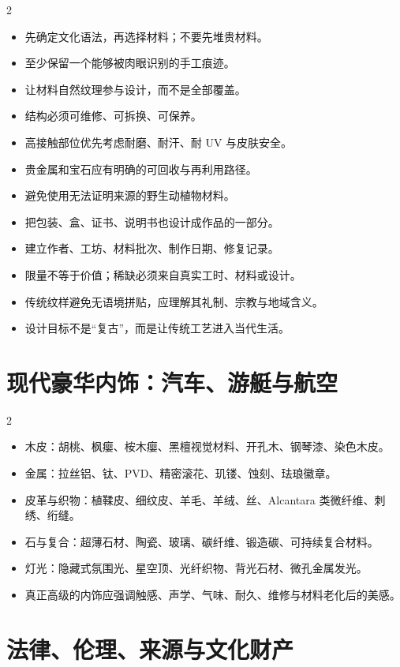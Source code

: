 \documentclass[lang=en,a4paper,11pt]{elegantpaper}
\begin{document}
\begin{multicols}{2}
\begin{itemize}
\item 先确定文化语法，再选择材料；不要先堆贵材料。
\item 至少保留一个能够被肉眼识别的手工痕迹。
\item 让材料自然纹理参与设计，而不是全部覆盖。
\item 结构必须可维修、可拆换、可保养。
\item 高接触部位优先考虑耐磨、耐汗、耐 UV 与皮肤安全。
\item 贵金属和宝石应有明确的可回收与再利用路径。
\item 避免使用无法证明来源的野生动植物材料。
\item 把包装、盒、证书、说明书也设计成作品的一部分。
\item 建立作者、工坊、材料批次、制作日期、修复记录。
\item 限量不等于价值；稀缺必须来自真实工时、材料或设计。
\item 传统纹样避免无语境拼贴，应理解其礼制、宗教与地域含义。
\item 设计目标不是“复古”，而是让传统工艺进入当代生活。
\end{itemize}
\end{multicols}

\section{现代豪华内饰：汽车、游艇与航空}


\begin{multicols}{2}
\begin{itemize}
\item 木皮：胡桃、枫瘿、桉木瘿、黑檀视觉材料、开孔木、钢琴漆、染色木皮。
\item 金属：拉丝铝、钛、PVD、精密滚花、玑镂、蚀刻、珐琅徽章。
\item 皮革与织物：植鞣皮、细纹皮、羊毛、羊绒、丝、Alcantara 类微纤维、刺绣、绗缝。
\item 石与复合：超薄石材、陶瓷、玻璃、碳纤维、锻造碳、可持续复合材料。
\item 灯光：隐藏式氛围光、星空顶、光纤织物、背光石材、微孔金属发光。
\item 真正高级的内饰应强调触感、声学、气味、耐久、维修与材料老化后的美感。
\end{itemize}
\end{multicols}

\section{法律、伦理、来源与文化财产}
\end{document}
